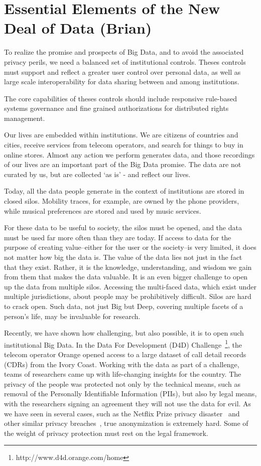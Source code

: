 \section{Essential Elements of the New Deal of Data (Brian)}

To realize the promise and prospects of Big Data, and to avoid the associated privacy perils, we need a balanced set of institutional controls.
Theses controls must support and reflect a greater user control over personal data, as well as large scale interoperability for data sharing between and among institutions.

The core capabilities of theses controls should include responsive rule-based systems governance and fine grained authorizations for distributed rights management.

Our lives are embedded within institutions.
We are citizens of countries and cities, receive services from telecom operators, and search for things to buy in online stores.
Almost any action we perform generates data, and those recordings of our lives are an important part of the Big Data promise.
The data are not curated by us, but are collected `as is' - and reflect our lives.

Today, all the data people generate in the context of institutions are stored in closed silos. 
Mobility traces, for example, are owned by the phone providers, while musical preferences are stored and used by music services.

For these data to be useful to society, the silos must be opened, and the data must be used far more often than they are today.
If access to data for the purpose of creating value--either for the user or the society--is very limited, it does not matter how big the data is.
The value of the data lies not just in the fact that they exist.
Rather, it is the knowledge, understanding, and wisdom we gain from them that makes the data valuable.
It is an even bigger challenge to open up the data from multiple silos.
Accessing the multi-faced data, which exist under multiple jurisdictions, about people may be prohibitively difficult.
Silos are hard to crack open.
Such data, not just Big but Deep, covering multiple facets of a person's life, may be invaluable for research.

Recently, we have shown how challenging, but also possible, it is to open such institutional Big Data.
In the Data For Development (D4D) Challenge~\footnote{http://www.d4d.orange.com/home}, the telecom operator Orange opened access to a large dataset of call detail records (CDRs) from the Ivory Coast.
Working with the data as part of a challenge, teams of researchers came up with life-changing insights for the country.
The privacy of the people was protected not only by the technical means, such as removal of the Personally Identifiable Information (PIIs), but also by legal means, with the researchers signing an agreement they will not use the data for evil.
As we have seen in several cases, such as the Netflix Prize privacy disaster~\cite{narayanan2008robust} and other similar privacy breaches~\cite{sweeney2000simple}, true anonymization is extremely hard.
Some of the weight of privacy protection must rest on the legal framework.

